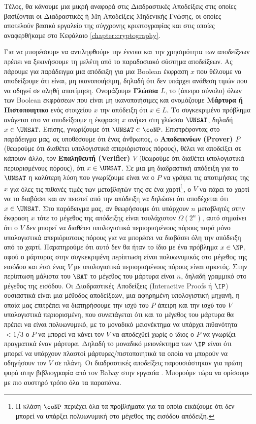 Τέλος, θα κάνουμε μια μικρή αναφορά στις Διαδραστικές Αποδείξεις στις οποίες βασίζονται οι Διαδραστικές ή Μη Αποδείξεις Μηδενικής Γνώσης, οι οποίες αποτελούν βασικό εργαλείο της σύγχρονης κρυπτογραφίας και στις οποίες αναφερθήκαμε στο Κεφάλαιο \ref{chapter:cryptography}.

Για να μπορέσουμε να αντιληφθούμε την έννοια και την χρησιμότητα των αποδείξεων πρέπει να ξεκινήσουμε τη μελέτη από το παραδοσιακό σύστημα αποδείξεων.  Ας πάρουμε για παράδειγμα μια απόδειξη για μια Boolean έκφραση $x$ που θέλουμε να αποδείξουμε ότι είναι, μη ικανοποιήσιμη, δηλαδή ότι δεν υπάρχει ανάθεση τιμών που να οδηγεί σε αληθή αποτίμηση. Ονομάζουμε \textbf{Γλώσσα $L$}, το (άπειρο σύνολο) όλων των Boolean εκφράσεων που είναι μη ικανοποιήσιμες και ονομάζουμε \textbf{Μάρτυρα ή Πιστοποιητικο} ενός στοιχείου $x$ την απόδειξη  ότι $x \in L$. Το συγκεκριμένο πρόβλημα ανάγεται στο να αποδείξουμε η έκφραση $x$ ανήκει στη γλώσσα $\UNSAT$, δηλαδή $x \in \UNSAT$. 
Επίσης, γνωρίζουμε ότι $\UNSAT \in \coNP$. Επιστρέφοντας στο παράδειγμα μας, ας υποθέσουμε ότι ένας άνθρωπος, o \textbf{Αποδεικνύων (Prover) $P$} (θεωρούμε ότι διαθέτει υπολογιστικά απεριόριστους πόρους), θέλει να αποδείξει σε κάποιον άλλο, τον \textbf{Επαληθευτή (Verifier) $V$} (θεωρούμε ότι διαθέτει υπολογιστικά περιορισμένους πόρους), ότι $x \in \UNSAT$. Σε μια μη διαδραστική απόδειξη για το $\UNSAT$ η καλύτερη λύση που γνωρίζουμε είναι να ο $P$ να γράψει τις αποτιμήσεις της $x$ για όλες τις πιθανές τιμές των μεταβλητών της σε ένα χαρτί\footnote{Η κλάση $\coNP$ περιέχει όλα τα προβλήματα για τα οποία εικάζουμε ότι δεν μπορεί να υπάρξει πολυωνυμική στο μέγεθος της εισόδου απόδειξη.}, ο $V$ να πάρει το χαρτί να το διαβάσει και αν πειστεί από την απόδειξη να δηλώσει ότι αποδέχεται ότι $x \in \UNSAT$. Στο παράδειγμα μας, αν θεωρήσουμε ότι υπάρχουν $n$ μεταβλητές στην έκφραση $x$ τότε το μέγεθος της απόδειξης είναι τουλάχιστον $Ω(2^n)$, αυτό σημαίνει ότι ο $V$ δεν μπορεί να διαθέτει υπολογιστικά περιορισμένους πόρους παρά μόνο υπολογιστικά απεριόριστους πόρους για να μπορέσει να διαβάσει όλη την απόδειξη από το χαρτί. Παρατηρούμε ότι αυτό δεν θα ήταν το ίδιο με ένα πρόβλημα $x \in \NP$, αφού ο μάρτυρας στην συγκεκριμένη περίπτωση είναι πολυωνυμικός στο μέγεθος της εισόδου και έτσι ένας $V$ με υπολογιστικά περιορισμένους πόρους είναι αρκετός. Στην περίπτωση μάλιστα του $\SAT$ το μέγεθος του μάρτυρα είναι $n$, δηλαδή γραμμικό στο μέγεθος της εισόδου. Οι Διαδραστικές Αποδείξεις (Interactive Proofs ή $\IP$) ουσιαστικά είναι μια μέθοδος αποδείξεων, μια αφηρημένη υπολογιστική μηχανή, η οποία μας επιτρέπει να διατηρήσουμε την ισχύ του $P$ άπειρη και την ισχύ του $V$ υπολογιστικά περιορισμένη, που συνεπάγεται ότι και το μέγεθος του μάρτυρα θα πρέπει να είναι πολυωνυμικό, με το μοναδικό μειονέκτημα να υπάρχει πιθανότητα $<1/3$ ο $P$ να μπορεί να κάνει τον $V$ να αποδεχθεί χωρίς ο ίδιος ο $P$ να γνωρίζει πραγματικά έναν μάρτυρα. Δηλαδή το μοναδικό μειονέκτημα των $\IP$ είναι ότι μπορεί να υπάρχουν πλαστοί μάρτυρες/πιστοποιητικά τα οποία να μπορούν να οδηγήσουν τον $V$ σε πλάνη. Οι διαδραστικές αποδείξεις παρουσιάστηκαν για πρώτη φορά στην βιβλιογραφία από τον Babay στην εργασία \cite{10.1145/22145.22192} . Μπορούμε τώρα να ορίσουμε με πιο αυστηρό τρόπο όλα τα παραπάνω.

